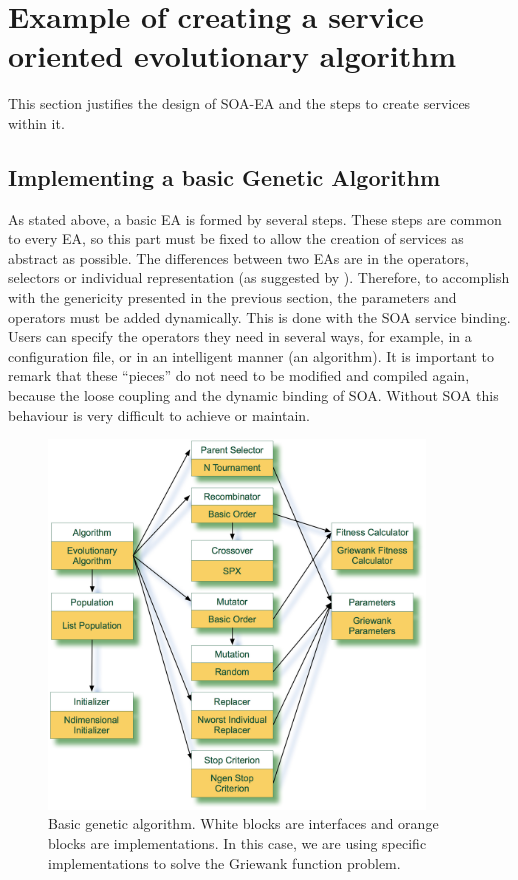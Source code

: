 \section{Example of creating a service oriented evolutionary algorithm}
This section justifies the design of SOA-EA and the steps to create services within it. 
\subsection{Implementing a basic Genetic Algorithm}

As  stated above, a basic EA is formed by several steps. These steps are common to every EA, so this part must be fixed  to allow the creation of services as abstract as possible. The differences between two EAs are in the operators, selectors or individual representation (as suggested by  \cite{ParameterTuningEiben2011}). Therefore, to accomplish with the genericity presented in the previous section, the parameters and operators must be added dynamically. This is done with the SOA service binding. Users can specify the operators they need in several ways, for example, in a configuration file, or in an intelligent manner (an algorithm). It is important to remark that these ``pieces'' do not need to be modified and compiled again, because the loose coupling and the dynamic binding of SOA. Without SOA this behaviour is very difficult to achieve or maintain.


\begin{figure}
\centering
\includegraphics[width=10cm]{gfx/soaea/basicga.jpg}
\caption{Basic genetic algorithm. White blocks are interfaces and orange blocks are implementations. In this case, we are using specific implementations to solve the Griewank function problem.}
\label{BASICGAEXAMPLE}
\end{figure}





